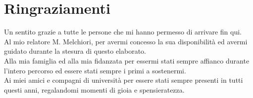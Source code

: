 \chapter*{Ringraziamenti}
Un sentito grazie a tutte le persone che mi hanno permesso di arrivare fin qui.\\
Al mio relatore M. Melchiori, per avermi concesso la sua disponibilità ed
avermi guidato durante la stesura di questo elaborato.\\
Alla mia famiglia ed alla mia fidanzata per essermi stati sempre affianco durante
l'intero percorso ed essere stati sempre i primi a sostenermi.\\
Ai miei amici e compagni di università per essere stati sempre presenti in tutti
questi anni, regalandomi momenti di gioia e spensieratezza.


